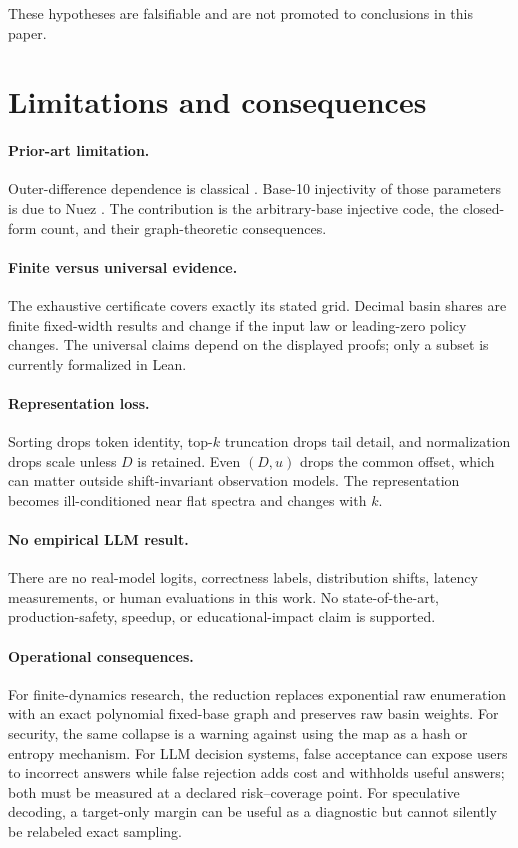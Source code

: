 \documentclass[11pt]{article}
\theoremstyle{definition}
\theoremstyle{remark}
\newcommand{\1}{\mathbf{1}}
\begin{document}
These hypotheses are falsifiable and are not promoted to conclusions in this
paper.

\section{Limitations and consequences}

\paragraph{Prior-art limitation.}
Outer-difference dependence is classical \cite{prichett1981}.  Base-10
injectivity of those parameters is due to Nuez \cite[eq.~(14)]{nuez2022}.
The contribution is the arbitrary-base injective code, the closed-form count,
and their graph-theoretic consequences.

\paragraph{Finite versus universal evidence.}
The exhaustive certificate covers exactly its stated grid.  Decimal basin
shares are finite fixed-width results and change if the input law or
leading-zero policy changes.  The universal claims depend on the displayed
proofs; only a subset is currently formalized in Lean.

\paragraph{Representation loss.}
Sorting drops token identity, top-$k$ truncation drops tail detail, and
normalization drops scale unless $D$ is retained.  Even $(D,u)$ drops the
common offset, which can matter outside shift-invariant observation models.
The representation becomes ill-conditioned near flat spectra and changes
with $k$.

\paragraph{No empirical LLM result.}
There are no real-model logits, correctness labels, distribution shifts,
latency measurements, or human evaluations in this work.  No state-of-the-art,
production-safety, speedup, or educational-impact claim is supported.

\paragraph{Operational consequences.}
For finite-dynamics research, the reduction replaces exponential raw
enumeration with an exact polynomial fixed-base graph and preserves raw basin
weights.  For security, the same collapse is a warning against using the map
as a hash or entropy mechanism.  For LLM decision systems, false acceptance
can expose users to incorrect answers while false rejection adds cost and
withholds useful answers; both must be measured at a declared risk--coverage
point.  For speculative decoding, a target-only margin can be useful as a
diagnostic but cannot silently be relabeled exact sampling.
\end{document}
